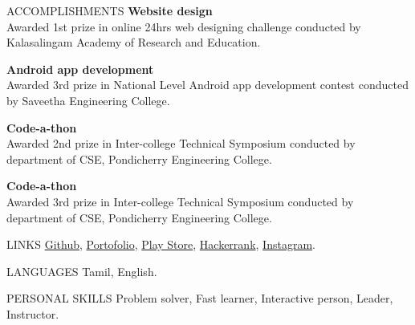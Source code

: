 \documentclass{template}
\begin{document}
\begin{rSection}{ACCOMPLISHMENTS}
\textbf{Website design} \\
Awarded 1st prize in online 24hrs web designing challenge conducted by Kalasalingam Academy of Research and Education.

\textbf{Android app development} \\
Awarded 3rd prize in National Level Android app development contest conducted by Saveetha Engineering College.

\textbf{Code-a-thon} \\
Awarded 2nd prize in Inter-college Technical Symposium conducted by department of CSE, Pondicherry Engineering College.

\textbf{Code-a-thon} \\
Awarded 3rd prize in Inter-college Technical Symposium conducted by department of CSE, Pondicherry Engineering College.

\end{rSection}

\begin{rSection}{LINKS}
\href{https://github.com/princesanjivy}{Github},
\href{https://princesanjivy-portfolio.web.app/}{Portofolio},
\href{https://play.google.com/store/apps/dev?id=6439925551269057866}{Play Store},
\href{https://www.hackerrank.com/profile/sanjivy_android}{Hackerrank},
\href{https://www.instagram.com/princesanjivy}{Instagram}.

\end{rSection}

\begin{rSection}{LANGUAGES}
Tamil, English.

\end{rSection}

\begin{rSection}{PERSONAL SKILLS}
Problem solver, Fast learner, Interactive person, Leader, Instructor.

\end{rSection}
\end{document}
